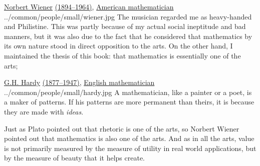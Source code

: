 \qboxnpq
  {\href{http://en.wikipedia.org/wiki/Norbert_Wiener}{Norbert Wiener}
   \href{http://www-history.mcs.st-andrews.ac.uk/Timelines/TimelineG.html}{(1894--1964)},
   \href{http://www-history.mcs.st-andrews.ac.uk/BirthplaceMaps/Places/USA.html}{American mathematician}
    \footnotemark
  }
  {../common/people/small/wiener.jpg}
  {The musician regarded me as heavy-handed and Philistine.
   This was partly because of my actual social ineptitude and bad manners,
   but it was also due to the fact that he considered that mathematics
   by its own nature stood in direct opposition to the arts.
   On the other hand, I maintained the thesis of this book:
   that mathematics is essentially one of the arts;}


\qboxnps
  {\href{http://en.wikipedia.org/wiki/G._H._Hardy}{G.H. Hardy}
   \href{http://www-history.mcs.st-andrews.ac.uk/Timelines/TimelineG.html}{(1877--1947)},
   \href{http://www-history.mcs.st-andrews.ac.uk/BirthplaceMaps/Places/UK.html}{English mathematician}
    \footnotemark
  }
  {../common/people/small/hardy.jpg}
  {A mathematician, like a painter or a poet, is a maker of patterns. 
   If his patterns are more permanent than theirs, 
   it is because they are made with \emph{ideas}.}




Just as Plato pointed out that rhetoric is
one of the arts,
so Norbert Wiener pointed out that mathematics is also
one of the arts.
And as in all the arts, value is not primarily measured by
the measure of utility in real world applications,
but by the measure of beauty that it helps create.



